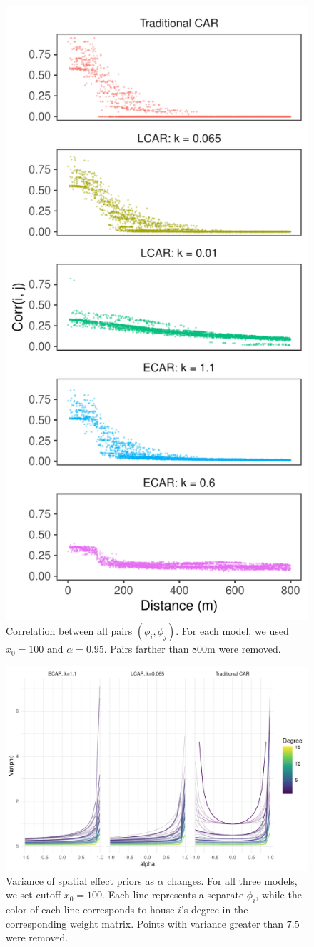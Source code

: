\documentclass{scrartcl}
\begin{document}
\begin{figure}
  \centering
  \includegraphics[width=.5\linewidth]{fig2}
  \caption{Correlation between all pairs $(\phi_i, \phi_j)$. For each
    model, we used $x_0 = 100$ and $\alpha = 0.95$. Pairs farther
    than 800m were removed.}
  \label{fig:fig2}
\end{figure}

\begin{figure}
  \centering
  \includegraphics[width=\linewidth]{fig3}
  \caption{Variance of spatial effect priors as $\alpha$ changes. For
    all three models, we set cutoff $x_0 = 100$. Each line represents
    a separate $\phi_i$, while the color of each line corresponds to
    house $i$'s degree in the corresponding weight matrix. Points with
    variance greater than $7.5$ were removed.}
  \label{fig:fig3}
\end{figure}
\end{document}
